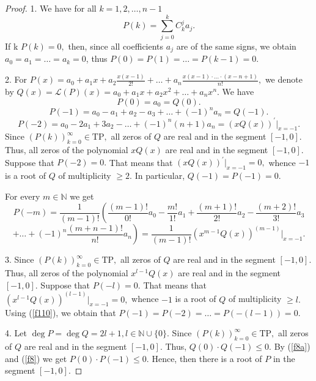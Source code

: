 \documentclass[12pt]{amsart}
\numberwithin{count}{section}
\begin{document}
\begin{proof}

1. We have for all $k=1, 2, \ldots, n-1$
\begin{equation}
\label{f7}
P(k) = \sum_{j=0}^k C_k^j  a_j.
\end{equation}
If k $P(k)=0,$ then, since all coefficients $a_j$ are of the same signs, we obtain
$a_0=a_1= \ldots = a_k =0$, thus $P(0) = P(1) = \ldots = P(k-1)=0.$



2. For  $P(x)= a_0 + a_1 x +a_2 \frac{x(x-1)}{2!} 
+  \ldots +a_n \frac{x(x-1)\cdot \ldots \cdot (x-n+1)}{n!},$ 
we denote by  $Q(x) = \mathcal{L}(P) (x) = a_0 +a_1x +a_2 x^2 + \ldots + a_n x^n.$
We have
\begin{equation}
\label{f8a}
P(0) = a_0  = Q(0).
\end{equation}
\begin{equation}
\label{f8}
P(-1) = a_0 - a_1 + a_2 -a_3 + \ldots + (-1)^n a_n = Q(-1).
\end{equation}
\begin{equation}
\label{f9}
P(-2) = a_0 - 2 a_1 + 3a_2 - \ldots + (-1)^n (n+1) a_n = (x Q(x))^\prime|_{x=-1}.
\end{equation}
Since $(P(k))_{k=0}^\infty \in \mathrm{TP},$ all zeros of $Q$ are real and in the segment $[-1, 0].$
Thus, all zeros of the polynomial $xQ(x)$ are real and in the segment $[-1, 0].$ Suppose 
that $P(-2)=0.$  That means that  $(x Q(x))^\prime|_{x=-1} =0,$  whence  $-1$ is a root of $Q$ 
of multiplicity $\geq 2.$ In particular, $Q(-1) = P(-1) =0.$

For every $m\in \mathbb{N}$ we get
$$
P(- m) = \frac{1}{(m-1)!} \left( \frac{(m-1)! }{0!} a_0 - \frac{m!}{1!} a_1 + \frac{(m+1)!}{2!} a_2 -  \frac{(m+2)!}{3! } a_3  \right.$$   
$$\left.   + \ldots + (-1)^n \frac{(m+n-1)!}{n!} a_n\right ) =
\frac{1}{(m-1)!}  \left(x^{m-1} Q(x)\right)^{(m-1)}|_{x=-1}.
$$

3.  Since $(P(k))_{k=0}^\infty \in \mathrm{TP},$ all zeros of $Q$ are real and in the segment $[-1, 0].$
Thus, all zeros of the polynomial $x^{l-1} Q(x)$ are real and in the segment $[-1, 0].$ Suppose 
that $P(- l)=0.$  That means that  $\left(x^{l-1} Q(x)\right)^{(l-1)}|_{x=-1} =0,$  whence  $-1$ 
is a root of $Q$ of multiplicity $\geq l.$ Using (\ref{f110}), we obtain that  
$P(-1) = P(-2) = \ldots = P(-(l-1))=0.$


4. Let  $\deg P = \deg Q = 2l+1, l \in \mathbb{N}\cup \{0\}. $ Since $(P(k))_{k=0}^\infty \in \mathrm{TP},$ 
all zeros of $Q$  are real and in the segment $[-1, 0].$  Thus, $Q(0)\cdot Q(-1) \leq 0.$
By (\ref{f8a}) and (\ref{f8}) we get $P(0)\cdot P(-1) \leq 0.$ Hence, then there is a 
root of $P$ in the segment $[-1, 0].$


\end{proof}
\end{document}
